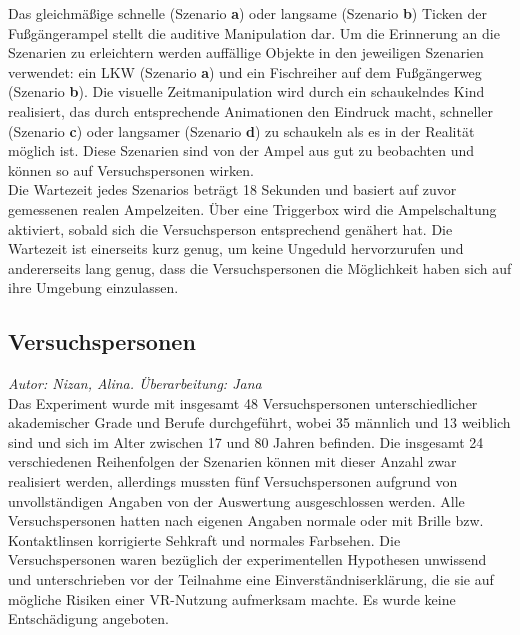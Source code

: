 \documentclass{Paper}
\begin{document}


Das gleichmäßige schnelle (Szenario \textbf{a}) oder langsame (Szenario \textbf{b}) Ticken der Fußgängerampel stellt die auditive Manipulation dar. Um die Erinnerung an die Szenarien zu erleichtern werden auffällige Objekte in den jeweiligen Szenarien verwendet: ein LKW (Szenario \textbf{a}) und ein Fischreiher auf dem Fußgängerweg (Szenario \textbf{b}).
Die visuelle Zeitmanipulation wird durch ein schaukelndes Kind realisiert, das durch entsprechende Animationen den Eindruck macht, schneller (Szenario \textbf{c}) oder langsamer (Szenario \textbf{d}) zu schaukeln als es in der Realität möglich ist. Diese Szenarien sind von der Ampel aus gut zu beobachten und können so auf Versuchspersonen wirken.\\
Die Wartezeit jedes Szenarios beträgt 18 Sekunden und basiert auf zuvor gemessenen realen Ampelzeiten. Über eine Triggerbox wird die Ampelschaltung aktiviert, sobald sich die Versuchsperson entsprechend genähert hat. Die Wartezeit ist einerseits kurz genug, um keine Ungeduld hervorzurufen und andererseits lang genug, dass die Versuchspersonen die Möglichkeit haben sich auf ihre Umgebung einzulassen. 

\subsection{Versuchspersonen}
        \textit{Autor: Nizan, Alina. Überarbeitung: Jana}\\
Das Experiment wurde mit insgesamt 48 Versuchspersonen unterschiedlicher akademischer Grade und Berufe  durchgeführt, wobei 35 männlich und 13 weiblich sind und sich im Alter zwischen 17 und 80 Jahren befinden. 
Die insgesamt 24 verschiedenen Reihenfolgen der Szenarien können mit dieser Anzahl zwar realisiert werden, allerdings mussten fünf Versuchspersonen aufgrund von unvollständigen Angaben von der Auswertung ausgeschlossen werden. 
Alle Versuchspersonen hatten nach eigenen Angaben normale oder mit Brille bzw. Kontaktlinsen korrigierte Sehkraft und normales Farbsehen. Die Versuchspersonen waren bezüglich der experimentellen Hypothesen unwissend und unterschrieben vor der Teilnahme eine Einverständniserklärung, die sie auf mögliche Risiken einer VR-Nutzung aufmerksam machte. Es wurde keine Entschädigung angeboten. 
\end{document}
